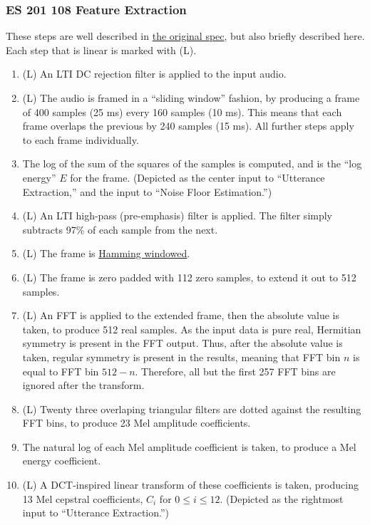 \documentclass{article}
\begin{document}
\subsubsection{ES 201 108 Feature Extraction}
These steps are well described in \href{http://www.etsi.org/deliver/etsi_es/201100_201199/201108/01.01.02_60/es_201108v010102p.pdf}{the original spec}, but also briefly described here.
\newcommand{\linear}{{\small\color{red}(L)}}
Each step that is linear is marked with \linear.
\renewcommand{\labelenumi}{\textbf{\Roman{enumi}.}}%
\begin{enumerate}
\item \linear{} An LTI DC rejection filter is applied to the input audio.
\item \linear{} The audio is framed in a ``sliding window'' fashion, by producing a frame of 400 samples (25 ms) every 160 samples (10 ms).
This means that each frame overlaps the previous by 240 samples (15 ms).
All further steps apply to each frame individually.
\item The log of the sum of the squares of the samples is computed, and is the ``log energy'' $E$ for the frame. (Depicted as the center input to ``Utterance Extraction,'' and the input to ``Noise Floor Estimation.'')
\item \linear{} An LTI high-pass (pre-emphasis) filter is applied. The filter simply subtracts 97\% of each sample from the next.
\item \linear{} The frame is \href{http://en.wikipedia.org/wiki/Window_function#Hamming_window}{Hamming windowed}.
\item \linear{} The frame is zero padded with 112 zero samples, to extend it out to 512 samples.
\item \linear{} An FFT is applied to the extended frame, then the absolute value is taken, to produce 512 real samples.
As the input data is pure real, Hermitian symmetry is present in the FFT output.
Thus, after the absolute value is taken, regular symmetry is present in the results, meaning that FFT bin $n$ is equal to FFT bin $512 - n$.
Therefore, all but the first 257 FFT bins are ignored after the transform.
\item \linear{} Twenty three overlaping triangular filters are dotted against the resulting FFT bins, to produce 23 Mel amplitude coefficients.
\item The natural log of each Mel amplitude coefficient is taken, to produce a Mel energy coefficient.
\item \linear{} A DCT-inspired linear transform of these coefficients is taken, producing 13 Mel cepstral coefficients, $C_i$ for $0 \le i \le 12$. (Depicted as the rightmost input to ``Utterance Extraction.'')
\end{enumerate}
\end{document}
